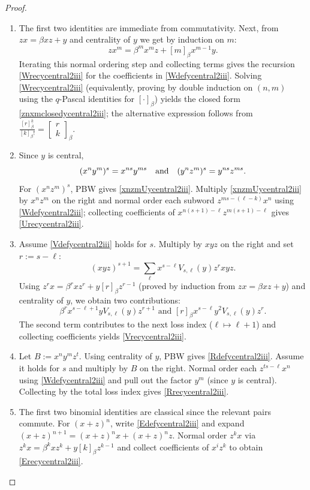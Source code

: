 \documentclass{amsart}
\theoremstyle{definition}
\theoremstyle{remark}
\numberwithin{equation}{section}
\begin{document}
\begin{proof}
\begin{enumerate}
\item [\rm (1)] The first two identities are immediate from commutativity.
Next, from $zx=\beta xz+y$ and centrality of $y$ we get by induction on $m$:
\[
z x^m=\beta^m x^m z+[m]_\beta x^{m-1}y.
\]
Iterating this normal ordering step and collecting terms gives the recursion \eqref{Wrecycentral2iii} for the coefficients in \eqref{Wdefycentral2iii}. Solving \eqref{Wrecycentral2iii} (equivalently, proving by double induction on $(n,m)$ using the $q$-Pascal identities for $[ \cdot ]_\beta$) yields the closed form \eqref{znxmclosedycentral2iii}; the alternative expression follows from $\frac{[r]^{\underline{k}}_\beta}{[k]_\beta!}=\begin{bmatrix}r\\k\end{bmatrix}_\beta$.

\item [\rm (2)] Since $y$ is central, 
$$
(x^n y^m)^s = x^{ns}y^{ms} \quad {\rm and} \quad (y^n z^m)^s=y^{ns}z^{ms}.
$$
For $(x^n z^m)^s$, PBW gives \eqref{xnzmUycentral2iii}. Multiply \eqref{xnzmUycentral2iii} by $x^n z^m$ on the right and normal order each subword $z^{ms-(\ell-k)}x^n$ using \eqref{Wdefycentral2iii}; collecting coefficients of $x^{n(s+1)-\ell}z^{m(s+1)-\ell}$ gives \eqref{Urecycentral2iii}.

\item [\rm (3)] Assume \eqref{Vdefycentral2iii} holds for $s$. Multiply by $xyz$ on the right and set $r:=s-\ell$:
\[
(xyz)^{s+1}=\sum_{\ell}x^{s-\ell}V_{s,\ell}(y)z^{r}xyz.
\]
Using $z^{r}x=\beta^{r}x z^{r}+y[r]_\beta z^{r-1}$ (proved by induction from $zx=\beta xz+y$) and centrality of $y$,
we obtain two contributions:
\[
\beta^{r}x^{s-\ell+1}yV_{s,\ell}(y)z^{r+1} \text{ and } [r]_\beta x^{s-\ell}y^{2}V_{s,\ell}(y)z^{r}.
\]
The second term contributes to the next loss index ($\ell\mapsto \ell+1$) and collecting coefficients yields \eqref{Vrecycentral2iii}.

\item [\rm (4)] Let $B:=x^n y^m z^t$. Using centrality of $y$, PBW gives \eqref{Rdefycentral2iii}.
Assume it holds for $s$ and multiply by $B$ on the right. Normal order each $z^{ts-\ell}x^n$ using \eqref{Wdefycentral2iii} and pull out the factor $y^m$ (since $y$ is central). Collecting by the total loss index gives \eqref{Rrecycentral2iii}.

\item [\rm (5)] The first two binomial identities are classical since the relevant pairs commute.
For $(x+z)^n$, write \eqref{Edefycentral2iii} and expand
$(x+z)^{n+1}=(x+z)^n x+(x+z)^n z$. Normal order $z^k x$ via $z^k x=\beta^k x z^k+y[k]_\beta z^{k-1}$ and collect coefficients of $x^i z^k$ to obtain
\eqref{Erecycentral2iii}.
\end{enumerate}
\end{proof}
\end{document}

